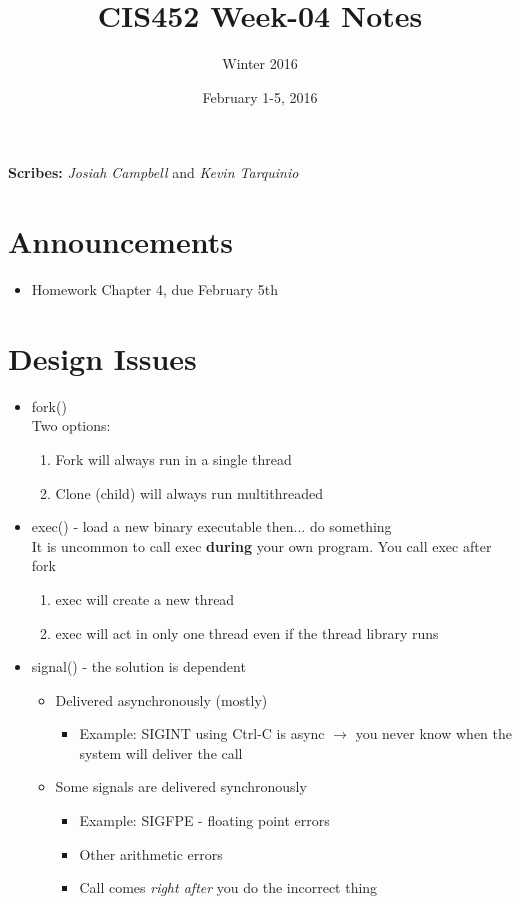 \documentclass[11pt]{article}
\title{CIS452 Week-04 Notes}
\author{Winter 2016}
\date{February 1-5, 2016}
\begin{document}
\maketitle

\noindent
\textbf{Scribes:} \textit{Josiah Campbell} and \textit{Kevin Tarquinio}

\section*{Announcements}
\begin{itemize}
  \item Homework Chapter 4, due February 5th
\end{itemize}

\section*{Design Issues}
\begin{itemize}
\item fork()
  \\Two options:
  \begin{enumerate}
  \item Fork will always run in a single thread
  \item Clone (child) will always run multithreaded
  \end{enumerate}
\item exec() - load a new binary executable then... do something\\
  It is uncommon to call exec \textbf{during} your own program. You call exec
  after fork
  \begin{enumerate}
  \item exec will create a new thread
  \item exec will act in only one thread even if the thread library runs
  \end{enumerate}
\item signal() - the solution is dependent
  \begin{itemize}
      \item Delivered asynchronously (mostly)
      \begin{itemize}
          \item Example: SIGINT using Ctrl-C is async $\rightarrow$ you never
          know when the system will deliver the call
      \end{itemize}
      \item Some signals are delivered synchronously
      \begin{itemize}
          \item Example: SIGFPE - floating point errors
          \item Other arithmetic errors
          \item Call comes \textit{right after} you do the incorrect thing
      \end{itemize}
  \end{itemize}
\end{itemize}
\end{document}
